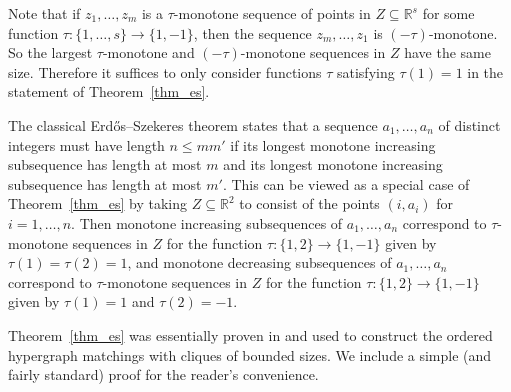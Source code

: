 \documentclass{aic}
\theoremstyle{definition}
\numberwithin{equation}{section}
\numberwithin{figure}{section}
\newcommand{\su}{\subseteq}
\begin{document}
Note that if $z_1, \ldots, z_m$ is a $\tau$-monotone sequence of points in $Z\su \mathbb{R}^s$ for some function $\tau: \{1,\dots,s\}\to \{1,-1\}$, then the sequence $z_m, \ldots, z_1$ is $(-\tau)$-monotone. So the largest $\tau$-monotone and $(-\tau)$-monotone sequences in $Z$ have the same size. Therefore it suffices to only consider functions $\tau$ satisfying $\tau(1)=1$ in the statement of Theorem~\ref{thm_es}.

The classical Erd{\H o}s--Szekeres theorem states that a sequence $a_1, \ldots, a_{n}$ of distinct integers must have length $n\le mm'$ if its longest monotone increasing subsequence has length at most $m$ and its longest monotone increasing subsequence has length at most $m'$. This can be viewed as a special case of Theorem~\ref{thm_es} by taking $Z\su \mathbb{R}^2$ to consist of the points $(i,a_i)$ for $i=1, \ldots, n$. Then monotone increasing subsequences of $a_1, \ldots, a_{n}$ correspond to $\tau$-monotone sequences in $Z$ for the function $\tau:\{1, 2\} \rightarrow \{1,-1\}$ given by $\tau(1)=\tau(2)=1$, and monotone decreasing subsequences of $a_1, \ldots, a_{n}$ correspond to $\tau$-monotone sequences in $Z$ for the function $\tau:\{1, 2\} \rightarrow \{1,-1\}$ given by $\tau(1)=1$ and $\tau(2)=-1$.

Theorem~\ref{thm_es} was essentially proven in \cite{DGR} and used to construct the ordered hypergraph matchings with cliques of bounded sizes. We include a simple (and fairly standard) proof for the reader's convenience.
\end{document}
